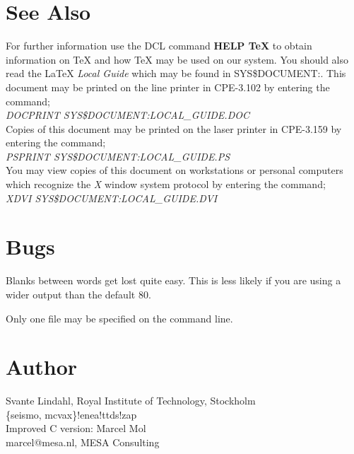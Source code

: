 \section*{See Also}
%
%
For further information use the DCL command {\bf HELP TeX}\/ to obtain
information on \TeX\/ and how \TeX\/ may be used on our system.
You should also read the \LaTeX\/ {\it Local Guide}\/ which may be found
in SYS\$DOCUMENT:.
This document may be printed on the line printer in CPE-3.102 by entering
the command;
\\[1ex]
{\em DOCPRINT SYS\$DOCUMENT:LOCAL\_GUIDE.DOC}
\\[1ex]
Copies of this document may be printed on the laser printer in CPE-3.159
by entering the command;
\\[1ex]
{\em PSPRINT SYS\$DOCUMENT:LOCAL\_GUIDE.PS}
\\[1ex]
You may view copies of this document on workstations or personal computers
which recognize the {\it X}\/ window system protocol by entering the command;
\\[1ex]
{\em XDVI SYS\$DOCUMENT:LOCAL\_GUIDE.DVI}
\section*{Bugs}
Blanks between words get lost quite easy. This is less
likely if you are using a wider output than the default 80.
\par\vspace{1.0\baselineskip}
Only one file may be specified on the command line.
\section*{Author}
Svante Lindahl, Royal Institute of Technology, Stockholm
\\[1ex]
\{seismo, mcvax\}!enea!ttds!zap
\\[1ex]
Improved C version: Marcel Mol
\\[1ex]
marcel@mesa.nl, MESA Consulting


